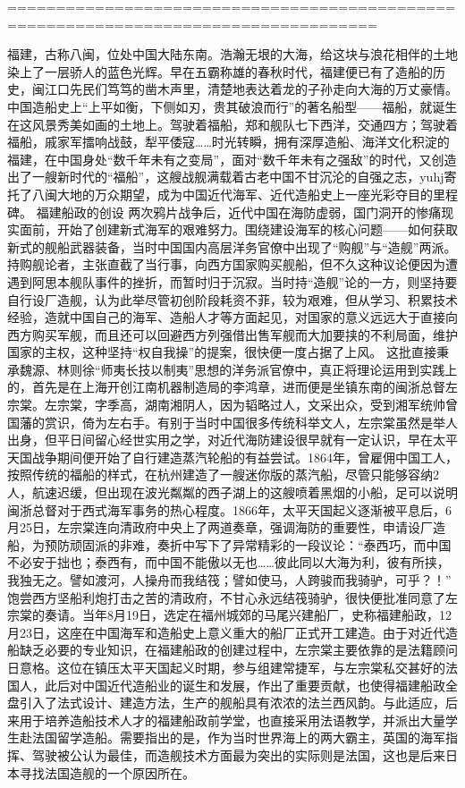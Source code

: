\documentclass[12pt,UTF8]{ctexbook}
\begin{document}
====================================================================================

福建，古称八闽，位处中国大陆东南。浩瀚无垠的大海，给这块与浪花相伴的土地染上了一层骄人的蓝色光辉。早在五霸称雄的春秋时代，福建便已有了造船的历史，闽江口先民们笃笃的凿木声里，清楚地表达着龙的子孙走向大海的万丈豪情。中国造船史上“上平如衡，下侧如刃，贵其破浪而行”的著名船型——福船，就诞生在这风景秀美如画的土地上。驾驶着福船，郑和舰队七下西洋，交通四方；驾驶着福船，戚家军擂响战鼓，犁平倭寇……时光转瞬，拥有深厚造船、海洋文化积淀的福建，在中国身处“数千年未有之变局”，面对“数千年未有之强敌”的时代，又创造出了一艘新时代的“福船”，这艘战舰满载着古老中国不甘沉沦的自强之志，yuhj寄托了八闽大地的万众期望，成为中国近代海军、近代造船史上一座光彩夺目的里程碑。
福建船政的创设
两次鸦片战争后，近代中国在海防虚弱，国门洞开的惨痛现实面前，开始了创建新式海军的艰难努力。围绕建设海军的核心问题——如何获取新式的舰船武器装备，当时中国国内高层洋务官僚中出现了“购舰”与“造舰”两派。持购舰论者，主张直截了当行事，向西方国家购买舰船，但不久这种议论便因为遭遇到阿思本舰队事件的挫折，而暂时归于沉寂。当时持“造舰”论的一方，则坚持要自行设厂造舰，认为此举尽管初创阶段耗资不菲，较为艰难，但从学习、积累技术经验，造就中国自己的海军、造船人才等方面起见，对国家的意义远远大于直接向西方购买军舰，而且还可以回避西方列强借出售军舰而大加要挟的不利局面，维护国家的主权，这种坚持“权自我操”的提案，很快便一度占据了上风。
这批直接秉承魏源、林则徐“师夷长技以制夷”思想的洋务派官僚中，真正将理论运用到实践上的，首先是在上海开创江南机器制造局的李鸿章，进而便是坐镇东南的闽浙总督左宗棠。左宗棠，字季高，湖南湘阴人，因为韬略过人，文采出众，受到湘军统帅曾国藩的赏识，倚为左右手。有别于当时中国很多传统科举文人，左宗棠虽然是举人出身，但平日间留心经世实用之学，对近代海防建设很早就有一定认识，早在太平天国战争期间便开始了自行建造蒸汽轮船的有益尝试。1864年，曾雇佣中国工人，按照传统的福船的样式，在杭州建造了一艘迷你版的蒸汽船，尽管只能够容纳2人，航速迟缓，但出现在波光粼粼的西子湖上的这艘喷着黑烟的小船，足可以说明闽浙总督对于西式海军事务的热心程度。1866年，太平天国起义逐渐被平息后，6月25日，左宗棠连向清政府中央上了两道奏章，强调海防的重要性，申请设厂造船，为预防顽固派的非难，奏折中写下了异常精彩的一段议论：“泰西巧，而中国不必安于拙也；泰西有，而中国不能傲以无也……彼此同以大海为利，彼有所挟，我独无之。譬如渡河，人操舟而我结筏；譬如使马，人跨骏而我骑驴，可乎？！”
饱尝西方坚船利炮打击之苦的清政府，不甘心永远结筏骑驴，很快便批准同意了左宗棠的奏请。当年8月19日，选定在福州城郊的马尾兴建船厂，史称福建船政，12月23日，这座在中国海军和造船史上意义重大的船厂正式开工建造。由于对近代造船缺乏必要的专业知识，在福建船政的创建过程中，左宗棠主要依靠的是法籍顾问日意格。这位在镇压太平天国起义时期，参与组建常捷军，与左宗棠私交甚好的法国人，此后对中国近代造船业的诞生和发展，作出了重要贡献，也使得福建船政全盘引入了法式设计、建造方法，生产的舰船具有浓浓的法兰西风韵。与此适应，后来用于培养造船技术人才的福建船政前学堂，也直接采用法语教学，并派出大量学生赴法国留学造船。需要指出的是，作为当时世界海上的两大霸主，英国的海军指挥、驾驶被公认为最佳，而造舰技术方面最为突出的实际则是法国，这也是后来日本寻找法国造舰的一个原因所在。
\end{document}
